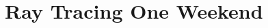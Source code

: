 \documentclass{si_template/cn_book}
\begin{document}
\frontmatter
\mainmatter

\chapter{Ray Tracing One Weekend}


\backmatter
\end{document}
